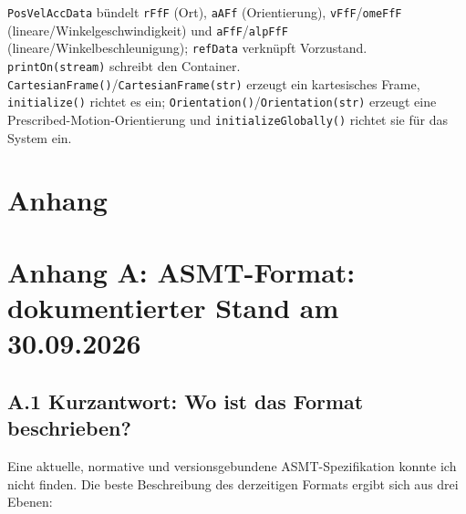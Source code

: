 \documentclass[
  12pt
]{book}
\begin{document}
\texttt{PosVelAccData} bündelt \texttt{rFfF} (Ort), \texttt{aAFf}
(Orientierung), \texttt{vFfF}/\texttt{omeFfF}
(lineare/Winkelgeschwindigkeit) und \texttt{aFfF}/\texttt{alpFfF}
(lineare/Winkelbeschleunigung); \texttt{refData} verknüpft Vorzustand.
\texttt{printOn(stream)} schreibt den Container.
\texttt{CartesianFrame()}/\texttt{CartesianFrame(str)} erzeugt ein
kartesisches Frame, \texttt{initialize()} richtet es ein;
\texttt{Orientation()}/\texttt{Orientation(str)} erzeugt eine
Prescribed-Motion-Orientierung und \texttt{initializeGlobally()} richtet
sie für das System ein.

\hypertarget{anhang}{%
\chapter{Anhang}\label{anhang}}

\hypertarget{anh-asmt-format}{%
\chapter{\texorpdfstring{{Anhang A:} ASMT-Format: dokumentierter Stand
am
30.09.2026}{Anhang A: ASMT-Format: dokumentierter Stand am 30.09.2026}}\label{anh-asmt-format}}

\hypertarget{kurzantwort-wo-ist-das-format-beschrieben}{%
\section{\texorpdfstring{{A.1} Kurzantwort: Wo ist das Format
beschrieben?}{A.1 Kurzantwort: Wo ist das Format beschrieben?}}\label{kurzantwort-wo-ist-das-format-beschrieben}}

Eine aktuelle, normative und versionsgebundene ASMT-Spezifikation konnte
ich nicht finden. Die beste Beschreibung des derzeitigen Formats ergibt
sich aus drei Ebenen:
\end{document}

